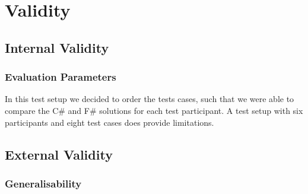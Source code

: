 \section{Validity} \label{sec:validity}


\subsection{Internal Validity}

\subsubsection{Evaluation Parameters}
In this test setup we decided to order the tests cases, such that we were able to compare the C\# and F\# solutions for each test participant. A test setup with six participants and eight test cases does provide limitations. 

\subsection{External Validity}


\subsubsection{Generalisability}
